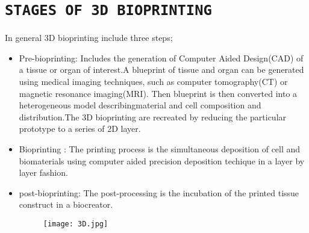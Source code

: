\documentclass[11pt]{article}
\begin{document}
\section{\Large\texttt{STAGES OF 3D BIOPRINTING}}
In general 3D bioprinting include three steps;\\
\begin{itemize}
\item Pre-bioprinting: Includes the generation of Computer Aided Design(CAD) of a tissue or organ of interest.A blueprint of tissue and organ can be generated using medical imaging techniques, such as computer tomography(CT) or magnetic resonance imaging(MRI).
 Then blueprint is then converted into a heterogeneous model describingmaterial and cell composition and distribution.The 3D bioprinting are recreated by reducing the particular prototype to a series of 2D layer.
 \item Bioprinting : The printing process is the simultaneous deposition of cell and biomaterials using computer aided precision deposition techique in a layer by layer fashion.
 \item post-bioprinting: The post-processing is the incubation of the printed tissue construct in a biocreator.   


\begin{figure}[h]
\centering
\texttt{[image: 3D.jpg]}
\end{figure}

\end{itemize}
\end{document}
